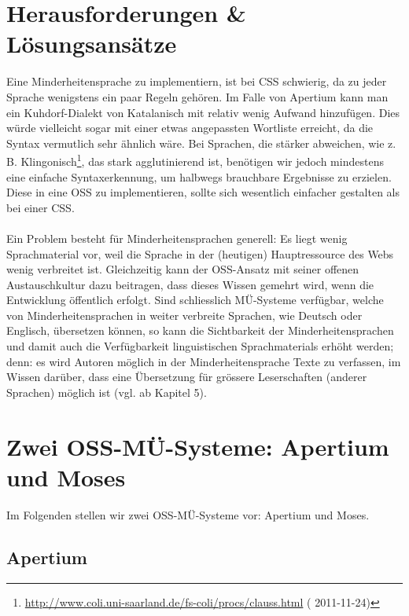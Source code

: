 \documentclass[11pt,twoside]{mparticle}
\newcommand{\urld}[2][???]{\url{#2} (\iflanguage{ngerman}{letzter
    Zugriff:}{accessed} #1)}
\begin{document}
\section{Herausforderungen \& Lösungsansätze}
\label{herausforderungen}
Eine Minderheitensprache zu implementiern, ist bei CSS schwierig, da
zu jeder Sprache wenigstens ein paar Regeln gehören. Im Falle von
Apertium kann man ein Kuhdorf-Dialekt von Katalanisch mit relativ
wenig Aufwand hinzufügen. Dies würde vielleicht sogar mit einer etwas
angepassten Wortliste erreicht, da die Syntax vermutlich sehr
ähnlich wäre. Bei Sprachen, die stärker abweichen, wie z. B. Klingonisch\footnote{\urld[2011-11-24]{http://www.coli.uni-saarland.de/fs-coli/procs/clauss.html}},
das stark agglutinierend ist, benötigen wir jedoch mindestens eine einfache 
Syntaxerkennung, um halbwegs brauchbare Ergebnisse zu erzielen. Diese in eine OSS zu
implementieren, sollte sich wesentlich einfacher gestalten als bei
einer CSS.
\\
\\
Ein Problem besteht für Minderheitensprachen generell: Es liegt wenig Sprachmaterial vor, weil die Sprache
in der (heutigen) Hauptressource des Webs wenig verbreitet ist. Gleichzeitig kann der OSS-Ansatz mit seiner
offenen Austauschkultur dazu beitragen, dass dieses Wissen gemehrt wird, wenn die Entwicklung öffentlich
erfolgt. Sind schliesslich MÜ-Systeme verfügbar, welche von Minderheitensprachen in weiter verbreite
Sprachen, wie Deutsch oder Englisch, übersetzen können, so kann die Sichtbarkeit der Minderheitensprachen
und damit auch die Verfügbarkeit linguistischen Sprachmaterials erhöht werden; denn: es wird Autoren möglich in der
Minderheitensprache Texte zu verfassen, im Wissen darüber, dass eine Übersetzung für grössere Leserschaften
(anderer Sprachen) möglich ist (vgl. \cite{forcada} ab Kapitel 5).

\section{Zwei OSS-MÜ-Systeme: Apertium und Moses}
\label{apertiumMoses}
Im Folgenden stellen wir zwei OSS-MÜ-Systeme vor: Apertium und Moses.

\subsection{Apertium}
\label{apertium}
\end{document}
